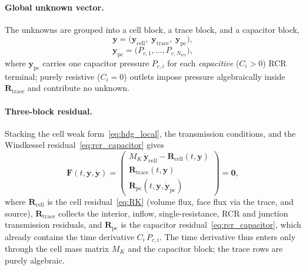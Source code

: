 \documentclass[11pt]{article}
\begin{document}
\paragraph{Global unknown vector.}
The unknowns are grouped into a cell block, a trace block, and a capacitor
block,
\begin{equation}
  \mathbf y
  =
  \bigl(\mathbf y_{\mathrm{cell}},\;
        \mathbf y_{\mathrm{trace}},\;
        \mathbf y_{\mathrm{pc}}\bigr),
  \label{eq:ida_y}
\end{equation}
\begin{equation}
  \mathbf y_{\mathrm{pc}}
  =\bigl(P_{c,1},\dots,P_{c,N_{\mathrm{rcr}}}\bigr),
  \label{eq:ida_ypc}
\end{equation}
where $\mathbf y_{\mathrm{pc}}$ carries one capacitor pressure $P_{c,i}$ for
each \emph{capacitive} ($C_i>0$) RCR terminal; purely resistive ($C_i=0$)
outlets impose pressure algebraically inside $\mathbf R_{\mathrm{trace}}$ and
contribute no unknown.

\paragraph{Three-block residual.}
Stacking the cell weak form~\eqref{eq:hdg_local}, the transmission conditions,
and the Windkessel residual~\eqref{eq:rcr_capacitor} gives
\begin{equation}
  \mathbf F(t,\mathbf y,\dot{\mathbf y})
  =
  \begin{pmatrix}
  M_K\,\dot{\mathbf y}_{\mathrm{cell}}-\mathbf R_{\mathrm{cell}}(t,\mathbf y)\\[6pt]
  \mathbf R_{\mathrm{trace}}(t,\mathbf y)\\[6pt]
  \mathbf R_{\mathrm{pc}}(t,\mathbf y,\dot{\mathbf y}_{\mathrm{pc}})
  \end{pmatrix}
  =\mathbf 0 ,
  \label{eq:ida_residual}
\end{equation}
where $\mathbf R_{\mathrm{cell}}$ is the cell residual~\eqref{eq:RK} (volume
flux, face flux via the trace, and source), $\mathbf R_{\mathrm{trace}}$
collects the interior, inflow, single-resistance, RCR and junction transmission
residuals, and $\mathbf R_{\mathrm{pc}}$ is the capacitor
residual~\eqref{eq:rcr_capacitor}, which already contains the time derivative
$C_i\,\dot P_{c,i}$. The time derivative thus enters only through the cell mass
matrix $M_K$ and the capacitor block; the trace rows are purely algebraic.
\end{document}
